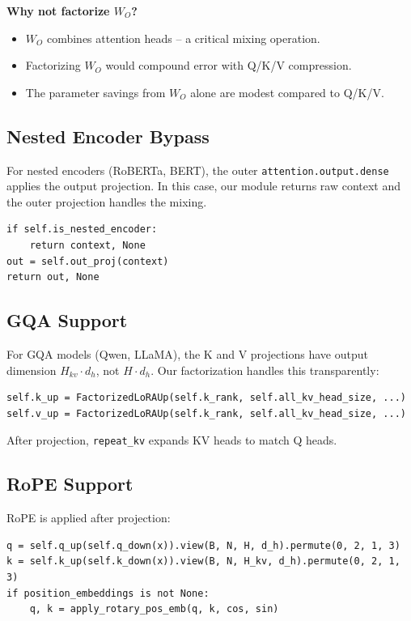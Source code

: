 \textbf{Why not factorize $W_O$?}

\begin{itemize}
\item $W_O$ combines attention heads -- a critical mixing operation.
\item Factorizing $W_O$ would compound error with Q/K/V compression.
\item The parameter savings from $W_O$ alone are modest compared to Q/K/V.

\end{itemize}
\subsection{Nested Encoder Bypass}

For nested encoders (RoBERTa, BERT), the outer \texttt{attention.output.dense} 
applies the output projection. In this case, our module returns raw context 
and the outer projection handles the mixing.

\begin{lstlisting}
if self.is_nested_encoder:
    return context, None
out = self.out_proj(context)
return out, None
\end{lstlisting}

\subsection{GQA Support}

For GQA models (Qwen, LLaMA), the K and V projections have output dimension 
$H_{kv} \cdot d_h$, not $H \cdot d_h$. Our factorization handles this 
transparently:

\begin{lstlisting}
self.k_up = FactorizedLoRAUp(self.k_rank, self.all_kv_head_size, ...)
self.v_up = FactorizedLoRAUp(self.k_rank, self.all_kv_head_size, ...)
\end{lstlisting}

After projection, \texttt{repeat\_kv} expands KV heads to match Q heads.

\subsection{RoPE Support}

RoPE is applied after projection:

\begin{lstlisting}
q = self.q_up(self.q_down(x)).view(B, N, H, d_h).permute(0, 2, 1, 3)
k = self.k_up(self.k_down(x)).view(B, N, H_kv, d_h).permute(0, 2, 1, 3)
if position_embeddings is not None:
    q, k = apply_rotary_pos_emb(q, k, cos, sin)
\end{lstlisting}

